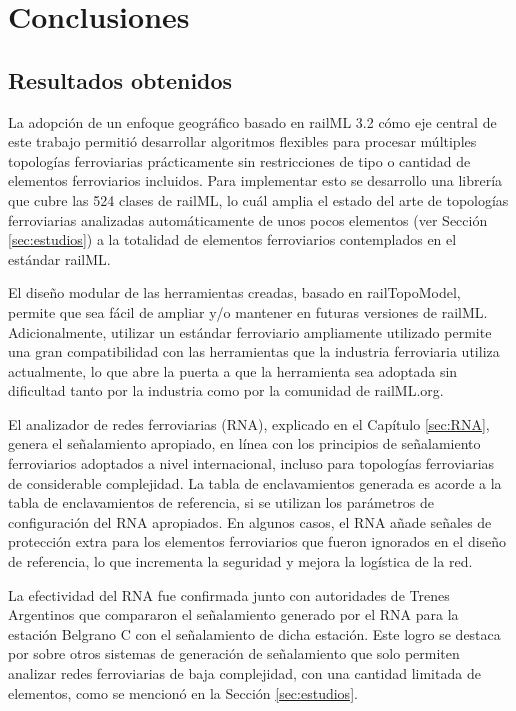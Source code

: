 \chapter{Conclusiones}

\section{Resultados obtenidos}

La adopción de un enfoque geográfico basado en railML 3.2 cómo eje central de este trabajo permitió desarrollar algoritmos flexibles para procesar múltiples topologías ferroviarias prácticamente sin restricciones de tipo o cantidad de elementos ferroviarios incluidos. Para implementar esto se desarrollo una librería que cubre las 524 clases de railML, lo cuál amplia el estado del arte de topologías ferroviarias analizadas automáticamente de unos pocos elementos (ver Sección \ref{sec:estudios}) a la totalidad de elementos ferroviarios contemplados en el estándar railML. 

El diseño modular de las herramientas creadas, basado en railTopoModel, permite que sea fácil de ampliar y/o mantener en futuras versiones de railML. Adicionalmente, utilizar un estándar ferroviario ampliamente utilizado permite una gran compatibilidad con las herramientas que la industria ferroviaria utiliza actualmente, lo que abre la puerta a que la herramienta sea adoptada sin dificultad tanto por la industria como por la comunidad de railML.org.

El analizador de redes ferroviarias (RNA), explicado en el Capítulo \ref{sec:RNA}, genera el señalamiento apropiado, en línea con los principios de señalamiento ferroviarios adoptados a nivel internacional, incluso para topologías ferroviarias de considerable complejidad. La tabla de enclavamientos generada es acorde a la tabla de enclavamientos de referencia, si se utilizan los parámetros de configuración del RNA apropiados. En algunos casos, el RNA añade señales de protección extra para los elementos ferroviarios que fueron ignorados en el diseño de referencia, lo que incrementa la seguridad y mejora la logística de la red.

La efectividad del RNA fue confirmada junto con autoridades de Trenes Argentinos que compararon el señalamiento generado por el RNA para la estación Belgrano C con el señalamiento de dicha estación. Este logro se destaca por sobre otros sistemas de generación de señalamiento que solo permiten analizar redes ferroviarias de baja complejidad, con una cantidad limitada de elementos, como se mencionó en la Sección \ref{sec:estudios}.

